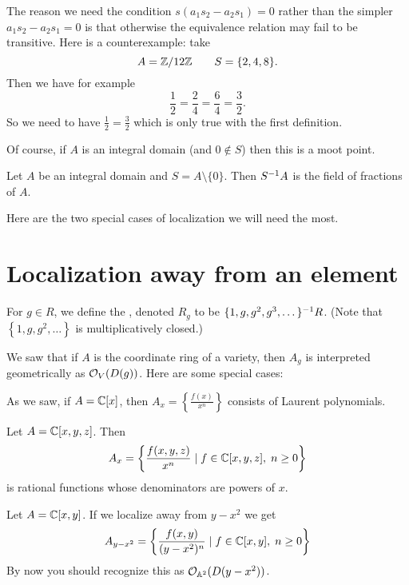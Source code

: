 \begin{remark}
	The reason we need the condition $s(a_1s_2 - a_2s_1) = 0$
	rather than the simpler $a_1s_2 - a_2s_1 = 0$ is that
	otherwise the equivalence relation may fail to be transitive.
	Here is a counterexample: take
	\[ A = \mathbb Z/12\mathbb Z \qquad S = \{ 2, 4, 8 \}. \]
	Then we have for example
	\[ \frac12 = \frac24 = \frac64 = \frac32. \]
	So we need to have $\frac12=\frac32$ which is only true
	with the first definition.

	Of course, if $A$ is an integral domain (and $0\notin S$)
	then this is a moot point.
\end{remark}

\begin{example}
	Let $A$ be an integral domain and $S = A \setminus \{0\}$.
	Then $S^{-1} A$ is the field of fractions of $A$.
\end{example}


Here are the two special cases of localization we will need the most.

\section{Localization away from an element}
\begin{definition}
	For $g \in R$, we define the ,
	denoted $R_g$ to be $\{1, g, g^2, g^3, \dots\}^{-1} R$.
	(Note that $\left\{ 1, g, g^2, \dots \right\}$ is multiplicatively closed.)
\end{definition}

\begin{example}
	We saw that if $A$ is the coordinate ring of a variety,
	then $A_g$ is interpreted geometrically as $\mathcal O_V(D(g))$.
	Here are some special cases:
	\begin{enumerate}[(a)]
		\ii As we saw, if $A = \mathbb C[x]$,
		then $A_{x} = \left\{ \frac{f(x)}{x^n} \right\}$
		consists of Laurent polynomials.

		\ii Let $A = \mathbb C[x,y,z]$.
		Then \[ A_x = \left\{ \frac{f(x,y,z)}{x^n} \mid
			f \in \mathbb C[x,y,z], \; n \ge 0 \right\} \]
		is rational functions whose denominators are powers of $x$.

		\ii Let $A = \mathbb C[x,y]$.
		If we localize away from $y-x^2$ we get
		\[ A_{y-x^2} = \left\{ \frac{f(x,y)}{(y-x^2)^n} \mid
			f \in \mathbb C[x,y], \; n \ge 0 \right\} \]
		By now you should recognize this as $\mathcal O_{\mathbb A^2}(D(y-x^2))$.
	\end{enumerate}
\end{example}

